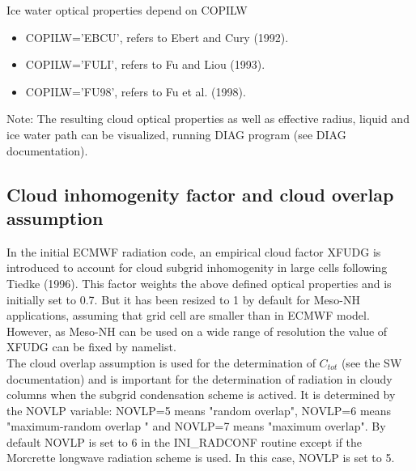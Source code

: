 Ice water optical properties depend on COPILW

\begin{itemize}
\item COPILW='EBCU', refers to Ebert and Cury (1992).

\item COPILW='FULI', refers to Fu and Liou (1993).

\item COPILW='FU98', refers to Fu et al. (1998).
\end{itemize}

Note: The resulting cloud optical properties as well as effective radius, liquid and ice water path can be visualized, running DIAG program (see DIAG documentation).



\subsection{Cloud inhomogenity factor and cloud overlap assumption}

In the initial ECMWF radiation code, an empirical cloud factor XFUDG is introduced to account for cloud subgrid inhomogenity in large cells following Tiedke (1996). This factor weights the above defined optical properties and is initially set to 0.7. But it has been resized to 1 by default for Meso-NH applications, assuming that grid cell are smaller than in ECMWF model. However, as Meso-NH can be used on a wide range of resolution the value of XFUDG can be fixed by namelist.\\ 

The cloud overlap  assumption is used for the determination of $C_{tot}$ (see the SW documentation) and is important for the determination of radiation in cloudy columns when the subgrid condensation scheme is actived. It is determined by the NOVLP variable: NOVLP=5 means "random overlap", NOVLP=6 means "maximum-random overlap " and NOVLP=7 means "maximum overlap". By default NOVLP is set to 6 in the INI\_RADCONF routine except if the Morcrette longwave radiation scheme is used. In this case, NOVLP is set to 5. 


